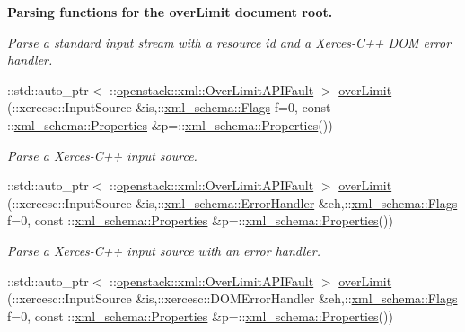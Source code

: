 \begin{Indent}{\bf Parsing functions for the overLimit document root.}
\begin{DoxyCompactItemize}
\begin{DoxyCompactList}\small\item\em Parse a standard input stream with a resource id and a Xerces-\/C++ DOM error handler. \item\end{DoxyCompactList}\item 
::std::auto\_\-ptr$<$ ::\hyperlink{classopenstack_1_1xml_1_1OverLimitAPIFault}{openstack::xml::OverLimitAPIFault} $>$ \hyperlink{namespaceopenstack_1_1xml_af12885e9a2e0116ce3f6c8e5267ea51e}{overLimit} (::xercesc::InputSource \&is,::\hyperlink{namespacexml__schema_affb4c227cbd9aa7453dd1dc5a1401943}{xml\_\-schema::Flags} f=0, const ::\hyperlink{namespacexml__schema_ad27ce19a7ee1d3b1064092648898f64c}{xml\_\-schema::Properties} \&p=::\hyperlink{namespacexml__schema_ad27ce19a7ee1d3b1064092648898f64c}{xml\_\-schema::Properties}())
\begin{DoxyCompactList}\small\item\em Parse a Xerces-\/C++ input source. \item\end{DoxyCompactList}\item 
::std::auto\_\-ptr$<$ ::\hyperlink{classopenstack_1_1xml_1_1OverLimitAPIFault}{openstack::xml::OverLimitAPIFault} $>$ \hyperlink{namespaceopenstack_1_1xml_ac63ffdc9619d14a948c32c5e531ee223}{overLimit} (::xercesc::InputSource \&is,::\hyperlink{namespacexml__schema_ab1c9361bfd3b404eaabf0c31eded79dc}{xml\_\-schema::ErrorHandler} \&eh,::\hyperlink{namespacexml__schema_affb4c227cbd9aa7453dd1dc5a1401943}{xml\_\-schema::Flags} f=0, const ::\hyperlink{namespacexml__schema_ad27ce19a7ee1d3b1064092648898f64c}{xml\_\-schema::Properties} \&p=::\hyperlink{namespacexml__schema_ad27ce19a7ee1d3b1064092648898f64c}{xml\_\-schema::Properties}())
\begin{DoxyCompactList}\small\item\em Parse a Xerces-\/C++ input source with an error handler. \item\end{DoxyCompactList}\item 
::std::auto\_\-ptr$<$ ::\hyperlink{classopenstack_1_1xml_1_1OverLimitAPIFault}{openstack::xml::OverLimitAPIFault} $>$ \hyperlink{namespaceopenstack_1_1xml_aad1e534da7b44dc514c95275bd6d4c3c}{overLimit} (::xercesc::InputSource \&is,::xercesc::DOMErrorHandler \&eh,::\hyperlink{namespacexml__schema_affb4c227cbd9aa7453dd1dc5a1401943}{xml\_\-schema::Flags} f=0, const ::\hyperlink{namespacexml__schema_ad27ce19a7ee1d3b1064092648898f64c}{xml\_\-schema::Properties} \&p=::\hyperlink{namespacexml__schema_ad27ce19a7ee1d3b1064092648898f64c}{xml\_\-schema::Properties}())

\end{DoxyCompactItemize}
\end{Indent}
